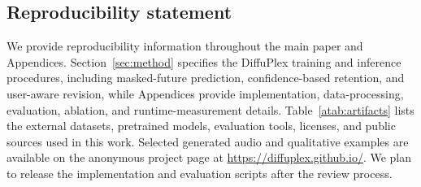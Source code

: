 \subsection*{Reproducibility statement}
We provide reproducibility information throughout the main paper and Appendices.
Section~\ref{sec:method} specifies the DiffuPlex training and inference procedures, including masked-future prediction, confidence-based retention, and user-aware revision, while Appendices provide implementation, data-processing, evaluation, ablation, and runtime-measurement details.
Table~\ref{atab:artifacts} lists the external datasets, pretrained models, evaluation tools, licenses, and public sources used in this work.
Selected generated audio and qualitative examples are available on the anonymous project page at
\url{https://diffuplex.github.io/}.
We plan to release the implementation and evaluation scripts after the review process.

